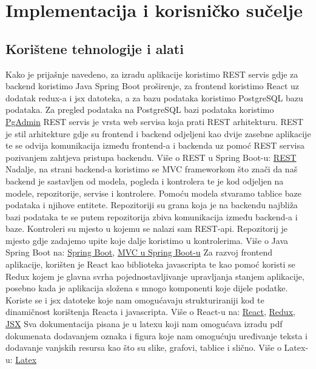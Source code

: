 \chapter{Implementacija i korisničko sučelje}
		
		
		\section{Korištene tehnologije i alati}
			
			Kako je prijašnje navedeno, za izradu aplikacije koristimo REST servis gdje za backend koristimo Java Spring Boot proširenje, za frontend koristimo React uz dodatak redux-a i jsx datoteka, a za bazu podataka koristimo PostgreSQL bazu podataka.
			\bigbreak
			Za pregled podataka na PostgreSQL bazi podataka koristimo \href{https://www.pgadmin.org/}{PgAdmin}
			\bigbreak
			REST servis je vrsta web servisa koja prati REST arhitekturu. REST je stil arhitekture gdje su frontend i backend odjeljeni kao dvije zasebne aplikacije te se odvija komunikacija između frontend-a i backenda uz pomoć REST servisa pozivanjem zahtjeva pristupa backendu.
			\bigbreak
			Više o REST u Spring Boot-u: \href{https://spring.io/guides/tutorials/rest/}{REST}
			\bigbreak
			Nadalje, na strani backend-a koristimo se MVC frameworkom što znači da naš backend je sastavljen od modela, pogleda i kontrolera te je kod odjeljen na modele, repozitorije, servise i kontrolere. Pomoću modela stvaramo tablice baze podataka i njihove entitete. Repozitoriji su grana koja je na backendu najbliža bazi podataka te se putem repozitorija zbiva komunikacija između backend-a i baze. Kontroleri su mjesto u kojemu se nalazi sam REST-api. Repozitorij je mjesto gdje zadajemo upite koje dalje koristimo u kontrolerima.
			\bigbreak
			Više o Java Spring Boot na: \href{https://spring.io/projects/spring-boot/}{Spring Boot}, 
			\href{https://spring.io/guides/gs/serving-web-content/}{MVC u Spring Boot-u}
			\bigbreak
			Za razvoj frontend aplikacije, korišten je React kao biblioteka javascripta te kao pomoć koristi se Redux kojem je glavna svrha pojednostavljivanje upravljanja stanjem aplikacije, posebno kada je aplikacija složena s mnogo komponenti koje dijele podatke. Koriste se i jsx datoteke koje nam omogućavaju strukturiraniji kod te dinamičnost korištenja Reacta i javascripta.
			\bigbreak
			Više o React-u na: \href{https://react.dev/learn}{React}, \href{https://redux.js.org/}{Redux}, \href{https://legacy.reactjs.org/docs/introducing-jsx.html}{JSX}
			\bigbreak
			Sva dokumentacija pisana je u latexu koji nam omogućava izradu pdf dokumenata dodavanjem oznaka i figura koje nam omogućuju uređivanje teksta i dodavanje vanjskih resursa kao što su slike, grafovi, tablice i slično.
			\bigbreak
			Više o Latex-u: \href{https://www.latex-project.org/}{Latex}
			\bigbreak
			\eject 
		
